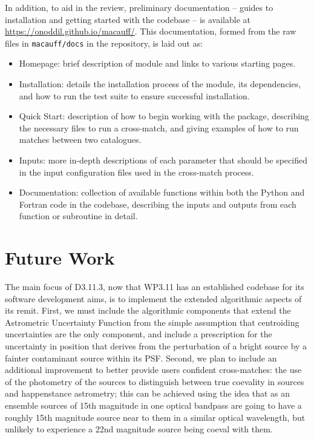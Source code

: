\documentclass[a4paper,11pt]{scrartcl}
\begin{document}
In addition, to aid in the review, preliminary documentation -- guides to installation and getting started with the codebase -- is available at \href{https://onoddil.github.io/macauff/}{https://onoddil.github.io/macauff/}.
This documentation, formed from the raw files in \texttt{macauff/docs} in the repository, is laid out as:

\begin{itemize}
	\item Homepage: brief description of module and links to various starting pages.
	\item Installation: details the installation process of the module, its dependencies, and how to run the test suite to ensure successful installation.
	\item Quick Start: description of how to begin working with the package, describing the necessary files to run a cross-match, and giving examples of how to run matches between two catalogues.
	\item Inputs: more in-depth descriptions of each parameter that should be specified in the input configuration files used in the cross-match process.
	\item Documentation: collection of available functions within both the Python and Fortran code in the codebase, describing the inputs and outputs from each function or subroutine in detail.
\end{itemize}

\section{Future Work}
The main focus of D3.11.3, now that WP3.11 has an established codebase for its software development aims, is to implement the extended algorithmic aspects of its remit.
First, we must include the algorithmic components that extend the Astrometric Uncertainty Function from the simple assumption that centroiding uncertainties are the only component, and include a prescription for the uncertainty in position that derives from the perturbation of a bright source by a fainter contaminant source within its PSF.
Second, we plan to include an additional improvement to better provide users confident cross-matches: the use of the photometry of the sources to distinguish between true coevality in sources and happenstance astrometry; this can be achieved using the idea that as an ensemble sources of 15th magnitude in one optical bandpass are going to have a roughly 15th magnitude source near to them in a similar optical wavelength, but unlikely to experience a 22nd magnitude source being coeval with them.
\end{document}
